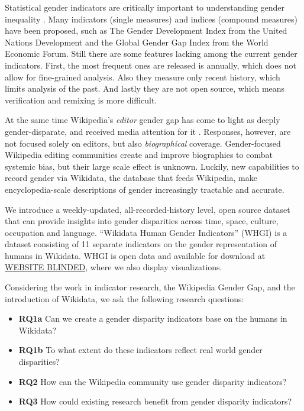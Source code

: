 \documentclass{sig-alternate-05-2015}
\begin{document}
Statistical gender indicators are critically important to understanding gender inequality \cite{klasen_gender-related_2004}. Many indicators (single measures) and indices (compound measures) have been proposed, such as The Gender Development Index from the United Nations Development and the Global Gender Gap Index from the World Economic Forum. Still there are some features lacking among the current gender indicators. First, the most frequent ones are released is annually, which does not allow for fine-grained analysis. Also they measure only recent history, which limits analysis of the past. And lastly they are not open source, which means verification and remixing is more difficult.


At the same time Wikipedia's \textit{editor} gender gap has come to light as deeply gender-disparate, and received media attention for it \cite{cohen_wikipedia_2011}. Responses, however, are not focused solely on editors, but also \textit{biographical} coverage. Gender-focused Wikipedia editing communities create and improve biographies to combat systemic bias, but their large scale effect is unknown. Luckily, new capabilities to record gender via Wikidata, the database that feeds Wikipedia, make encyclopedia-scale descriptions of gender increasingly tractable and accurate.

We introduce a weekly-updated, all-recorded-history level, open source dataset that can provide insights into gender disparities across time, space, culture, occupation and language. ``Wikidata Human Gender Indicators'' (WHGI) is a dataset consisting  of 11 separate indicators on the gender representation of humans in Wikidata. WHGI is open data and available for download at \url{WEBSITE BLINDED}, where we also display visualizations. 

Considering the work in indicator research, the Wikipedia Gender Gap, and the introduction of Wikidata, we ask the following research questions:
\begin{itemize}
\item\textbf{RQ1a} Can we create a gender disparity indicators base on the humans in Wikidata?
\item\textbf{RQ1b} To what extent do these indicators reflect real world gender disparities?
\item\textbf{RQ2} How can the Wikipedia community use gender disparity indicators?
\item\textbf{RQ3} How could existing research benefit from gender disparity indicators?
\end{itemize}
\end{document}
